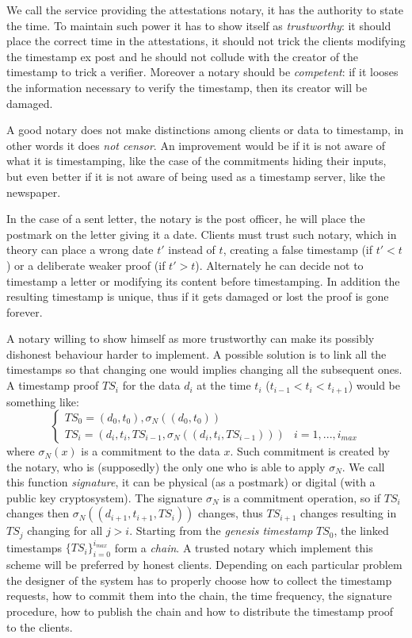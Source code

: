 We call the service providing the attestations notary, it has the authority to state the time. To maintain such power it has to show itself as \textit{trustworthy}: it should place the correct time in the attestations, it should not trick the clients modifying the timestamp ex post and he should not collude with the creator of the timestamp to trick a verifier. Moreover a notary should be \textit{competent}: if it looses the information necessary to verify the timestamp, then its creator will be damaged.

A good notary does not make distinctions among clients or data to timestamp, in other words it does \textit{not censor}. An improvement would be if it is not aware of what it is timestamping, like the case of the commitments hiding their inputs, but even better if it is not aware of being used as a timestamp server, like the newspaper.

In the case of a sent letter, the notary is the post officer, he will place the postmark on the letter giving it a date. 
Clients must trust such notary, which in theory can place a wrong date $t'$ instead of $t$, creating a false timestamp (if $t'<t$) or a deliberate weaker proof (if $t'>t$). Alternately he can decide not to timestamp a letter or modifying its content before timestamping. In addition the resulting timestamp is unique, thus if it gets damaged or lost the proof is gone forever.

A notary willing to show himself as more trustworthy can make its possibly dishonest behaviour harder to implement. A possible solution is to link all the timestamps so that changing one would implies changing all the subsequent ones. A timestamp proof $TS_i$ for the data $d_i$ at the time $t_i$ ($t_{i-1}<t_i<t_{i+1}$) would be something like:
\begin{equation}
	\label{singed-chain}
	\begin{cases}
		TS_0 =(d_0,t_0), \sigma_N((d_0,t_0)) & 
		\\
		TS_i =(d_i,t_i,TS_{i-1}, \sigma_N((d_i,t_i,TS_{i-1}))) & i = 1, ..., i_{max}		
	\end{cases}
\end{equation}
where $\sigma_N (x)$ is a commitment to the data $x$. Such commitment is created by the notary, who is (supposedly) the only one who is able to apply $\sigma_N$. We call this function \textit{signature}, it can be physical (as a postmark) or digital (with a public key cryptosystem). The signature $\sigma_N$ is a commitment operation, so if $TS_{i}$ changes then $\sigma_N((d_{i+1},t_{i+1},TS_i))$ changes, thus $TS_{i+1}$ changes resulting in $TS_j$ changing for all $j>i$. Starting from the \textit{genesis timestamp} $TS_0$, the linked timestamps $\{ TS_{i} \}_{i=0}^{i_{max}}$ form a \textit{chain}. A trusted notary which implement this scheme will be preferred by honest clients. Depending on each particular problem the designer of the system has to properly choose how to collect the timestamp requests, how to commit them into the chain, the time frequency, the signature procedure, how to publish the chain and how to distribute the timestamp proof to the clients.

